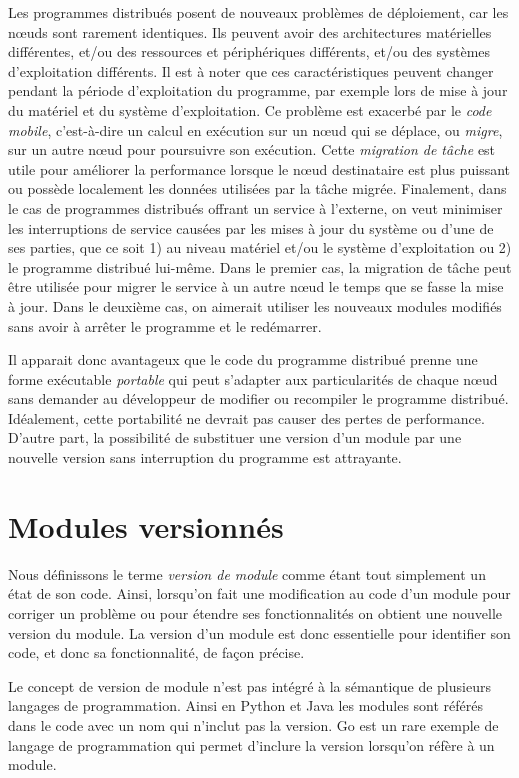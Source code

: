 Les programmes distribués posent de nouveaux problèmes de déploiement,
car les nœuds sont rarement identiques.  Ils peuvent avoir des
architectures matérielles différentes, et/ou des ressources et
périphériques différents, et/ou des systèmes d'exploitation
différents.  Il est à noter que ces caractéristiques peuvent changer
pendant la période d'exploitation du programme, par exemple lors de
mise à jour du matériel et du système d'exploitation.  Ce problème est
exacerbé par le \textit{code mobile}, c'est-à-dire un calcul en
exécution sur un nœud qui se déplace, ou \textit{migre}, sur un autre
nœud pour poursuivre son exécution.  Cette \textit{migration de
  tâche} est utile pour améliorer la performance lorsque le nœud
destinataire est plus puissant ou possède localement les données
utilisées par la tâche migrée.  Finalement, dans le cas de programmes
distribués offrant un service à l'externe, on veut minimiser les
interruptions de service causées par les mises à jour du système ou
d'une de ses parties, que ce soit 1) au niveau matériel et/ou le
système d'exploitation ou 2) le programme distribué lui-même.  Dans le
premier cas, la migration de tâche peut être utilisée pour migrer le
service à un autre nœud le temps que se fasse la mise à jour.  Dans
le deuxième cas, on aimerait utiliser les nouveaux modules
modifiés sans avoir à arrêter le programme et le redémarrer.

Il apparait donc avantageux que le code du programme distribué prenne
une forme exécutable \textit{portable} qui peut s'adapter aux
particularités de chaque nœud sans demander au développeur de
modifier ou recompiler le programme distribué.  Idéalement, cette
portabilité ne devrait pas causer des pertes de performance.  D'autre
part, la possibilité de substituer une version d'un module par une
nouvelle version sans interruption du programme est attrayante.

\section{Modules versionnés}
%
Nous définissons le terme \textit{version de module} comme étant tout
simplement un état de son code.  Ainsi, lorsqu'on fait une
modification au code d'un module pour corriger un problème ou pour
étendre ses fonctionnalités on obtient une nouvelle version du module.
La version d'un module est donc essentielle pour identifier son code,
et donc sa fonctionnalité, de façon précise.

Le concept de version de module n'est pas intégré à la sémantique de
plusieurs langages de programmation.  Ainsi en Python et Java les
modules sont référés dans le code avec un nom qui n'inclut pas la
version.  Go est un rare exemple de langage de programmation qui
permet d'inclure la version lorsqu'on réfère à un module.

